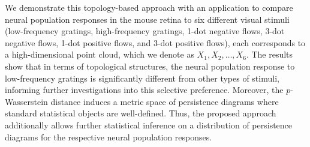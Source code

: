 \documentclass[9pt,conference]{IEEEtran}
\begin{document}

We demonstrate this topology-based approach with an application to compare neural population responses in the mouse retina to six different visual stimuli (low-frequency gratings, high-frequency gratings, 1-dot negative flows, 3-dot negative flows, 1-dot positive flows, and 3-dot positive flows), each corresponds to a high-dimensional point cloud, which we denote as $X_1, X_2, \dots,X_6$. The results show that in terms of topological structures, the neural population response to low-frequency gratings is significantly different from other types of stimuli, informing further investigations into this selective preference. Moreover, the $p$-Wasserstein distance induces a metric space of persistence diagrams where standard statistical objects are well-defined. Thus, the proposed approach additionally allows further statistical inference on a distribution of persistence diagrams for the respective neural population responses.

\end{document}
